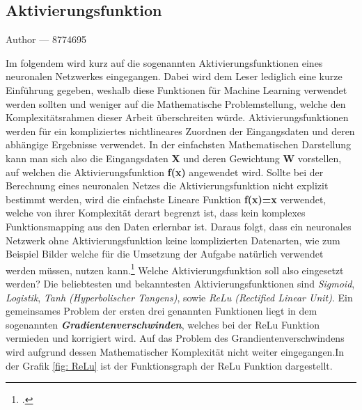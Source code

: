 \documentclass[12pt, a4paper]{report}
\makeatletter
\newcommand{\sectionauthor}[1]{%
  {\parindent0pt\vspace*{-5pt}%
  \large{Author --- }
  \linespread{1.1}\large\scshape#1%
  \par\nobreak\vspace*{35pt} }
  \@afterheading%
}
\makeatother
\begin{document}
\subsection{Aktivierungsfunktion}
\label{Aktivierungsfunktion}
\sectionauthor{8774695}
Im folgendem wird kurz auf die sogenannten Aktivierungsfunktionen eines neuronalen Netzwerkes eingegangen.
Dabei wird dem Leser lediglich eine kurze Einführung gegeben, weshalb diese Funktionen für Machine Learning verwendet werden sollten und weniger auf die Mathematische Problemstellung, welche den Komplexitätsrahmen dieser Arbeit überschreiten würde.
\newline
Aktivierungsfunktionen werden für ein kompliziertes nichtlineares Zuordnen der Eingangsdaten und deren abhängige Ergebnisse verwendet. In der einfachsten Mathematischen Darstellung kann man sich also die Eingangsdaten \textbf{X} und deren Gewichtung \textbf{W} vorstellen, auf welchen die Aktivierungsfunktion \textbf{f(x)} angewendet wird. Sollte bei der Berechnung eines neuronalen Netzes die Aktivierungsfunktion nicht explizit bestimmt werden, wird die einfachste Lineare Funktion \textbf{f(x)=x} verwendet, welche von ihrer Komplexität derart begrenzt ist, dass kein komplexes Funktionsmapping aus den Daten erlernbar ist. Daraus folgt, dass ein neuronales Netzwerk ohne Aktivierungsfunktion keine komplizierten Datenarten, wie zum Beispiel Bilder welche für die Umsetzung der Aufgabe natürlich verwendet werden müssen, nutzen kann.\footcite[Vgl.][]{Aktivierungsfunktion}
\newline
Welche Aktivierungsfunktion soll also eingesetzt werden? Die beliebtesten und bekanntesten Aktivierungsfunktionen sind \textit{Sigmoid}, \textit{Logistik}, \textit{Tanh (Hyperbolischer Tangens)}, sowie \textit{ReLu (Rectified Linear Unit)}.
Ein gemeinsames Problem der ersten drei genannten Funktionen liegt in dem sogenannten \textit{\textbf{Gradientenverschwinden}}, welches bei der ReLu Funktion vermieden und korrigiert wird. Auf das Problem des Grandientenverschwindens wird aufgrund dessen Mathematischer Komplexität nicht weiter eingegangen.In der Grafik \ref{fig: ReLu} ist der Funktionsgraph der ReLu Funktion dargestellt.
\end{document}
